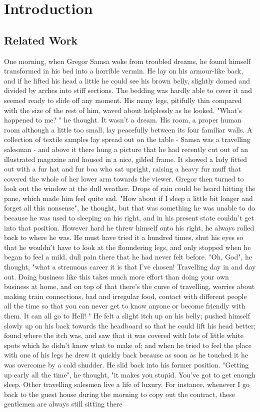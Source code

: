 \documentclass[listoffigures, listoftables]{ifathesis}
\begin{document}
\chapter{Introduction}

\section{Related Work}

One morning, when Gregor Samsa woke from troubled dreams, he found himself transformed in his bed into a horrible vermin. He lay on his armour-like back, and if he lifted his head a little he could see his brown belly, slightly domed and divided by arches into stiff sections. The bedding was hardly able to cover it and seemed ready to slide off any moment. His many legs, pitifully thin compared with the size of the rest of him, waved about helplessly as he looked. "What's happened to me? " he thought. It wasn't a dream. His room, a proper human room although a little too small, lay peacefully between its four familiar walls. A collection of textile samples lay spread out on the table - Samsa was a travelling salesman - and above it there hung a picture that he had recently cut out of an illustrated magazine and housed in a nice, gilded frame. It showed a lady fitted out with a fur hat and fur boa who sat upright, raising a heavy fur muff that covered the whole of her lower arm towards the viewer. Gregor then turned to look out the window at the dull weather. Drops of rain could be heard hitting the pane, which made him feel quite sad. "How about if I sleep a little bit longer and forget all this nonsense", he thought, but that was something he was unable to do because he was used to sleeping on his right, and in his present state couldn't get into that position. However hard he threw himself onto his right, he always rolled back to where he was. He must have tried it a hundred times, shut his eyes so that he wouldn't have to look at the floundering legs, and only stopped when he began to feel a mild, dull pain there that he had never felt before. "Oh, God", he thought, "what a strenuous career it is that I've chosen! Travelling day in and day out. Doing business like this takes much more effort than doing your own business at home, and on top of that there's the curse of travelling, worries about making train connections, bad and irregular food, contact with different people all the time so that you can never get to know anyone or become friendly with them. It can all go to Hell! " He felt a slight itch up on his belly; pushed himself slowly up on his back towards the headboard so that he could lift his head better; found where the itch was, and saw that it was covered with lots of little white spots which he didn't know what to make of; and when he tried to feel the place with one of his legs he drew it quickly back because as soon as he touched it he was overcome by a cold shudder. He slid back into his former position. "Getting up early all the time", he thought, "it makes you stupid. You've got to get enough sleep. Other travelling salesmen live a life of luxury. For instance, whenever I go back to the guest house during the morning to copy out the contract, these gentlemen are always still sitting there 
\end{document}
